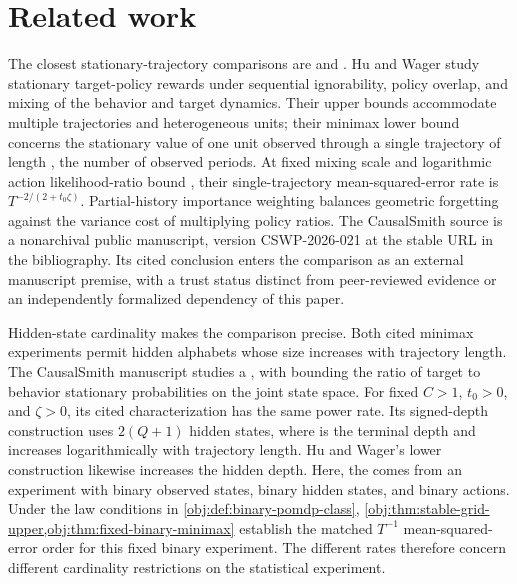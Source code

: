 \section{Related work}

The closest stationary-trajectory comparisons are \citet[Theorem 2.1, Corollary 2.2, and Theorem 3.1]{HuWager2023} and \citet[Theorem 1 (Uniform overlap frontier) and the Signed-depth family definition]{CausalSmithLatentOverlap2026}. Hu and Wager study stationary target-policy rewards under sequential ignorability, policy overlap, and mixing of the behavior and target dynamics. Their upper bounds accommodate multiple trajectories and heterogeneous units; their minimax lower bound concerns the stationary value of one unit observed through a single trajectory of length , the number of observed periods. At fixed mixing scale  and logarithmic action likelihood-ratio bound , their single-trajectory mean-squared-error rate is \(T^{-2/(2+t_0\zeta)}\). Partial-history importance weighting balances geometric forgetting against the variance cost of multiplying policy ratios. The CausalSmith source is a nonarchival public manuscript, version CSWP-2026-021 at the stable URL in the bibliography. Its cited conclusion enters the comparison as an external manuscript premise, with a trust status distinct from peer-reviewed evidence or an independently formalized dependency of this paper.

Hidden-state cardinality makes the comparison precise. Both cited minimax experiments permit hidden alphabets whose size increases with trajectory length. The CausalSmith manuscript studies a , with  bounding the ratio of target to behavior stationary probabilities on the joint state space. For fixed \(C>1\), \(t_0>0\), and \(\zeta>0\), its cited characterization has the same power rate. Its signed-depth construction uses \(2(Q+1)\) hidden states, where  is the terminal depth and increases logarithmically with trajectory length. Hu and Wager's lower construction likewise increases the hidden depth. Here, the  comes from an experiment with binary observed states, binary hidden states, and binary actions. Under the law conditions in \cref{obj:def:binary-pomdp-class}, \cref{obj:thm:stable-grid-upper,obj:thm:fixed-binary-minimax} establish the matched \(T^{-1}\) mean-squared-error order for this fixed binary experiment. The different rates therefore concern different cardinality restrictions on the statistical experiment.

